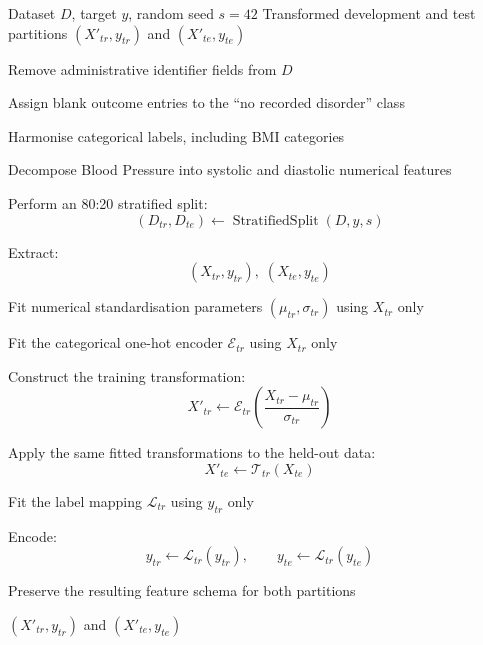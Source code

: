 \documentclass{elektr}
\begin{document}
\begin{algorithm}[H]
\caption{Leakage-Controlled Data Preparation and Feature Transformation}
\label{alg:prep}
\small
\begin{algorithmic}[1]

\Require Dataset $D$, target $y$, random seed $s=42$
\Ensure Transformed development and test partitions
$(X'_{tr},y_{tr})$ and $(X'_{te},y_{te})$

\State Remove administrative identifier fields from $D$

\State Assign blank outcome entries to the
``no recorded disorder'' class

\State Harmonise categorical labels, including BMI categories

\State Decompose Blood Pressure into systolic and
diastolic numerical features

\State Perform an 80:20 stratified split:
\[
(D_{tr},D_{te})\leftarrow
\operatorname{StratifiedSplit}(D,y,s)
\]

\State Extract:
\[
(X_{tr},y_{tr}),\;(X_{te},y_{te})
\]

\State Fit numerical standardisation parameters
$(\mu_{tr},\sigma_{tr})$ using $X_{tr}$ only

\State Fit the categorical one-hot encoder
$\mathcal{E}_{tr}$ using $X_{tr}$ only

\State Construct the training transformation:
\[
X'_{tr}
\leftarrow
\mathcal{E}_{tr}
\left(
\frac{X_{tr}-\mu_{tr}}{\sigma_{tr}}
\right)
\]

\State Apply the same fitted transformations to the
held-out data:
\[
X'_{te}
\leftarrow
\mathcal{T}_{tr}(X_{te})
\]

\State Fit the label mapping $\mathcal{L}_{tr}$ using
$y_{tr}$ only

\State Encode:
\[
y_{tr}\leftarrow\mathcal{L}_{tr}(y_{tr}),
\qquad
y_{te}\leftarrow\mathcal{L}_{tr}(y_{te})
\]

\State Preserve the resulting feature schema for both partitions

\State \Return
$(X'_{tr},y_{tr})$ and $(X'_{te},y_{te})$

\end{algorithmic}
\end{algorithm}
\end{document}
